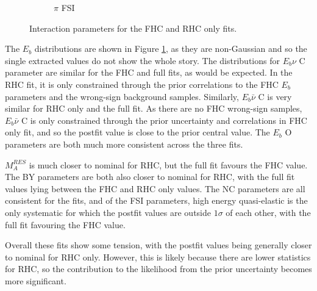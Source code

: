 \begin{figure}
\begin{subfigure}{0.49\textwidth}
  \caption{$\pi$ FSI}
\end{subfigure}
\caption{Interaction parameters for the FHC and RHC only fits.}
\label{fig:fhcrhcxsec}
\end{figure}

The $E_b$ distributions are shown in Figure \ref{fig:fhcrhcxsec}, as they are non-Gaussian and so the single extracted values do not show the whole story. The distributions for $E_b \nu$ C parameter are similar for the FHC and full fits, as would be expected. In the RHC fit, it is only constrained through the prior correlations to the FHC $E_b$ parameters and the wrong-sign background samples. Similarly, $E_b \bar{\nu}$ C is very similar for RHC only and the full fit. As there are no FHC wrong-sign samples, $E_b \bar{\nu}$ C is only constrained through the prior uncertainty and correlations in FHC only fit, and so the postfit value is close to the prior central value. The $E_b$ O parameters are both much more consistent across the three fits.

$M_{A}^{RES}$ is much closer to nominal for RHC, but the full fit favours the FHC value. The BY parameters are both also closer to nominal for RHC, with the full fit values lying between the FHC and RHC only values. The NC parameters are all consistent for the fits, and of the FSI parameters, high energy quasi-elastic is the only systematic for which the postfit values are outside $1\sigma$ of each other, with the full fit favouring the FHC value.

Overall these fits show some tension, with the postfit values being generally closer to nominal for RHC only. However, this is likely because there are lower statistics for RHC, so the contribution to the likelihood from the prior uncertainty becomes more significant.


